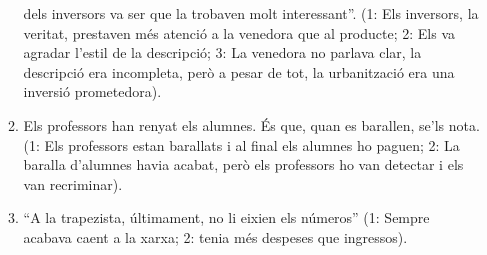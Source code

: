 \begin{enumerate}
\begin{enumerate}
        dels inversors va ser que la trobaven molt interessant''. (1:
        Els inversors, la veritat, prestaven més atenció a la venedora
        que al producte; 2: Els va agradar l'estil de la descripció;
        3: La venedora no parlava clar, la descripció era incompleta,
        però a pesar de tot, la urbanització era una inversió
        prometedora).
      \item Els professors han renyat els alumnes. És que, quan es
        barallen, se'ls nota. (1: Els professors estan barallats i al
        final els alumnes ho paguen; 2: La baralla d'alumnes havia
        acabat, però els professors ho van detectar i els van recriminar).
      \item ``A la trapezista, últimament, no li eixien els números''
        (1: Sempre acabava caent a la xarxa; 2: tenia més despeses que
        ingressos).

\end{enumerate}
\end{enumerate}
